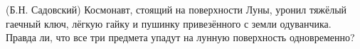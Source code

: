 (Б.Н. Садовский)
Космонавт, стоящий на поверхности Луны, уронил тяжёлый гаечный
ключ, лёгкую гайку и пушинку привезённого с земли одуванчика. Правда
ли, что все три предмета упадут на лунную поверхность одновременно?
